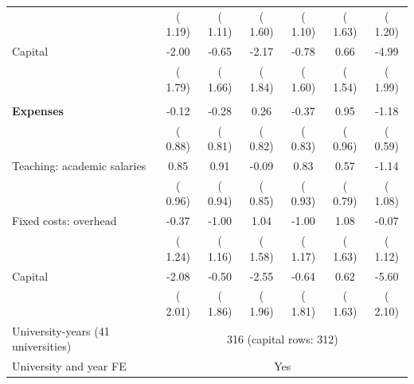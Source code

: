 \begin{tabular}{l*{6}{c}}
 & ( 1.19) & ( 1.11) & ( 1.60) & ( 1.10) & ( 1.63) & ( 1.20) \\
Capital &  -2.00 &  -0.65 &  -2.17 &  -0.78 &   0.66 &  -4.99\sym{**} \\
 & ( 1.79) & ( 1.66) & ( 1.84) & ( 1.60) & ( 1.54) & ( 1.99) \\
\addlinespace
\multicolumn{7}{l}{\textit{Per student, all levels (undergraduate, graduate, postitulo)}} \\
\textbf{Expenses} &  -0.12 &  -0.28 &   0.26 &  -0.37 &   0.95 &  -1.18\sym{**} \\
 & ( 0.88) & ( 0.81) & ( 0.82) & ( 0.83) & ( 0.96) & ( 0.59) \\
\quad Teaching: academic salaries &   0.85 &   0.91 &  -0.09 &   0.83 &   0.57 &  -1.14 \\
 & ( 0.96) & ( 0.94) & ( 0.85) & ( 0.93) & ( 0.79) & ( 1.08) \\
\quad Fixed costs: overhead &  -0.37 &  -1.00 &   1.04 &  -1.00 &   1.08 &  -0.07 \\
 & ( 1.24) & ( 1.16) & ( 1.58) & ( 1.17) & ( 1.63) & ( 1.12) \\
Capital &  -2.08 &  -0.50 &  -2.55 &  -0.64 &   0.62 &  -5.60\sym{***} \\
 & ( 2.01) & ( 1.86) & ( 1.96) & ( 1.81) & ( 1.63) & ( 2.10) \\
\midrule
University-years (41 universities) & \multicolumn{6}{c}{ 316 (capital rows:  312)} \\
University and year FE & \multicolumn{6}{c}{Yes} \\
\bottomrule
\end{tabular}
